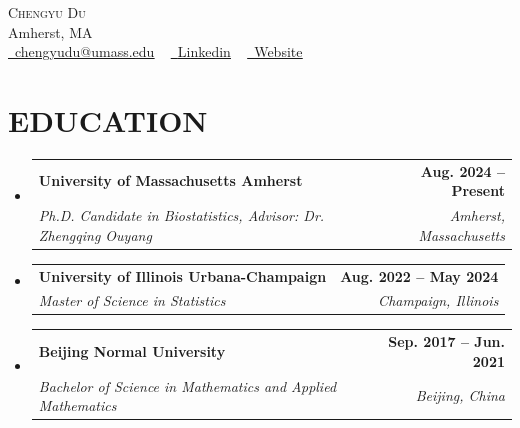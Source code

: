 \documentclass[letterpaper,11pt]{article}
\makeatletter
\newcommand{\resumeSubheading}[4]{
  \vspace{-2pt}\item
    \begin{tabular*}{1.0\textwidth}[t]{l@{\extracolsep{\fill}}r}
      \textbf{#1} & \textbf{\small #2} \\
      \textit{\small#3} & \textit{\small #4} \\
    \end{tabular*}\vspace{-7pt}
}
\newcommand{\resumeSubHeadingListStart}{\begin{itemize}[leftmargin=0.0in, label={}]}
\newcommand{\resumeSubHeadingListEnd}{\end{itemize}}
\makeatother
\begin{document}

\begin{center}
    {\Huge \scshape Chengyu Du} \\ \vspace{1pt}
    Amherst, MA \\ \vspace{1pt}
    \small %
    \href{mailto:chengyudu@umass.edu}{\raisebox{-0.2\height}\faEnvelope\  \underline{chengyudu@umass.edu}} ~ 
    \href{https://www.linkedin.com/in/chengyu-du/}{\raisebox{-0.2\height}\faLinkedin\ 
    \underline{Linkedin}}  ~
    \href{https://chengyuricardodu.github.io}
    {\raisebox{-0.2\height}\faGlobe\
    \underline{Website}}  ~
    \vspace{-8pt}
\end{center}


\section{EDUCATION}
    \resumeSubHeadingListStart
    \resumeSubheading
      {University of Massachusetts Amherst}{Aug. 2024 -- Present}
      {Ph.D. Candidate in Biostatistics, Advisor: Dr. Zhengqing Ouyang}{Amherst, Massachusetts}
      \resumeSubheading
      {University of Illinois Urbana-Champaign}{Aug. 2022 -- May 2024}
      {Master of Science in Statistics}{Champaign, Illinois}      
    \resumeSubheading
      {Beijing Normal University}{Sep. 2017 -- Jun. 2021}
      {Bachelor of Science in Mathematics and Applied Mathematics}{Beijing, China}
    \resumeSubHeadingListEnd


\end{document}

